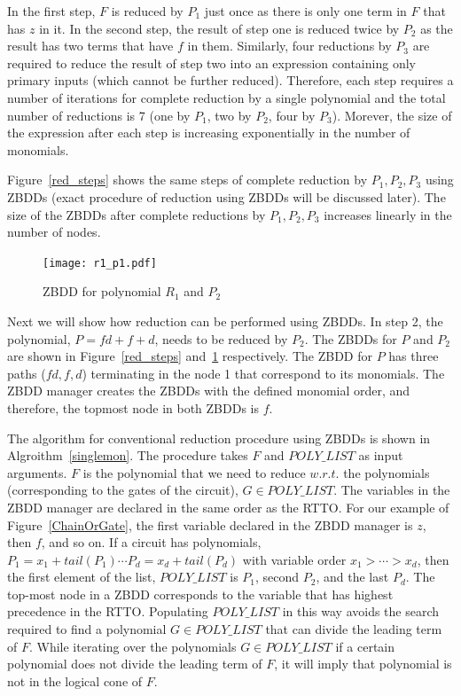 \documentclass{article}
\theoremstyle{definition}
\begin{document}
\par In the first step, $F$ is reduced by $P_1$ just once as there is only one term in $F$ that has $z$ in it. In the second step, the result of step one is reduced twice by $P_2$ as the result has two terms that have $f$ in them. Similarly, four reductions by $P_3$ are required to reduce the result of step two into an expression containing only primary inputs (which cannot be further reduced). Therefore, each step requires a number of iterations for complete reduction by a single polynomial and the total number of reductions is 7 (one by $P_1$, two by $P_2$, four by $P_3$). Morever, the size of the expression after each step is increasing exponentially in the number of monomials.
\par Figure~\ref{red_steps} shows the same steps of complete reduction by $P_1,P_2,P_3$ using ZBDDs (exact procedure of reduction using ZBDDs will be discussed later). The size of the ZBDDs after complete reductions by $P_1,P_2,P_3$ increases linearly in the number of nodes.


\begin{figure}
\centering
\texttt{[image: r1\_p1.pdf]}
\caption{ZBDD for polynomial $R_1$ and $P_2$}
\label{P2}
\end{figure}


\par Next we will show how reduction can be performed using ZBDDs. In step 2, the polynomial, $P = fd +f +d $, needs to be reduced by $P_2$. The ZBDDs for $P$ and $P_2$ are shown in Figure~\ref{red_steps} and~\ref{P2} respectively. The ZBDD for $P$ has three paths ($fd,f,d$) terminating in the node 1 that correspond to its monomials. The ZBDD manager creates the ZBDDs with the defined monomial order, and therefore, the topmost node in both ZBDDs is $f$. %

The algorithm for conventional reduction procedure using ZBDDs is shown in Algroithm~\ref{singlemon}. The procedure takes $F$ and $POLY\_LIST$ as input arguments. $F$ is the polynomial that we need to reduce $w.r.t.$ the polynomials (corresponding to the gates of the circuit),  $G \in POLY\_LIST$. The variables in the ZBDD manager are declared in the same order as the RTTO. For our example of Figure~\ref{ChainOrGate}, the first variable declared in the ZBDD manager is $z$, then $f$, and so on. If a circuit has polynomials, $P_1= x_1 + tail(P_1) \cdots P_d= x_d + tail(P_d)$ with variable order $x_1 > \cdots > x_d$, then the first element of the list, $POLY\_LIST$ is $P_1$, second $P_2$, and the last $P_d$. The top-most node in a ZBDD corresponds to the variable that has highest precedence in the RTTO. Populating $POLY\_LIST$ in this way avoids the search required to find a polynomial $G \in POLY\_LIST$ that can divide the leading term of $F$. While iterating over the polynomials $G \in POLY\_LIST$ if a certain polynomial does not divide the leading term of $F$, it will imply that polynomial is not in the logical cone of $F$.  
\end{document}
